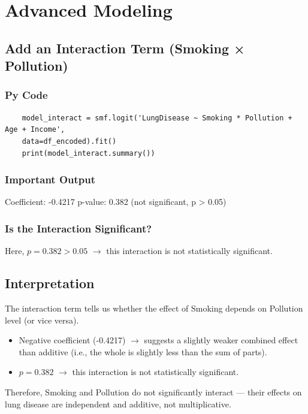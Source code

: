 \documentclass[a4paper,12pt]{article}
\begin{document}
\section{Advanced Modeling}

\subsection{Add an Interaction Term (Smoking × Pollution)}

\subsubsection{Py Code}
\begin{lstlisting}
	model_interact = smf.logit('LungDisease ~ Smoking * Pollution + Age + Income',
	data=df_encoded).fit()
	print(model_interact.summary())
\end{lstlisting}

\subsubsection{Important Output}
Coefficient: -0.4217  
p-value: 0.382 (not significant, p > 0.05)

\subsubsection{Is the Interaction Significant?}
Here, $p = 0.382 > 0.05$ $\rightarrow$ this interaction is not statistically significant.


\subsection{Interpretation}
The interaction term tells us whether the effect of Smoking depends on Pollution level (or vice versa).

\begin{itemize}
	\item Negative coefficient (-0.4217) $\rightarrow$ suggests a slightly weaker combined effect than additive (i.e., the whole is slightly less than the sum of parts).
	\item $p = 0.382$ $\rightarrow$ this interaction is not statistically significant.
\end{itemize}

Therefore, Smoking and Pollution do not significantly interact — their effects on lung disease are independent and additive, not multiplicative.
\end{document}
